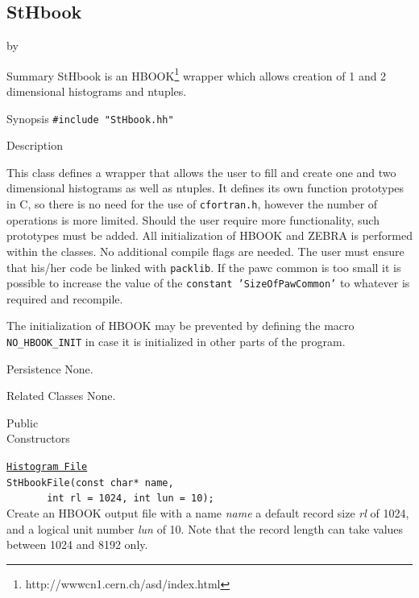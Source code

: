 \documentclass[twoside]{article}
\newcommand{\comp}[1]{\texttt{#1}}%
\newcommand{\entrylabel}[1]{\mbox{\textbf{{#1}}}\hfil}%
\newenvironment{entry}
{\begin{list}{}%
    {\renewcommand{\makelabel}{\entrylabel}%
     \setlength{\labelwidth}{90pt}%
     \setlength{\leftmargin}{\labelwidth}
     \advance\leftmargin by \labelsep%
      }%
    }%
  {\end{list}}
\newcommand{\Entrylabel}[1]%
{\raisebox{0pt}[1ex][0pt]{\makebox[\labelwidth][l]%
    {\parbox[t]{\labelwidth}{\hspace{0pt}\textbf{{#1}}}}}}
\newenvironment{Entry}%
{\renewcommand{\entrylabel}{\Entrylabel}\begin{entry}}%
  {\end{entry}}
\begin{document}
%
%
\subsection{StHbook } \label{StHbook}
\begin{Entry}
\item[Summary]
    StHbook is an HBOOK\footnote{http://wwwcn1.cern.ch/asd/index.html}
    wrapper which allows creation of 1 and 2 dimensional histograms
    and ntuples.

\item[Synopsis]
    \verb+#include "StHbook.hh"+\\    
    
\item[Description]   
    
  This class defines a wrapper that allows the user to fill and
  create one and two dimensional histograms as well as ntuples.
  It defines its own function prototypes in C, so there is no
  need for the use of \texttt{cfortran.h}, however
  the number of operations is more limited.  Should the user require
  more functionality, such prototypes must be added.
  All initialization of HBOOK and ZEBRA is performed within the
  classes.  No additional compile flags are needed.  The user
  must ensure that his/her code be linked with \comp{packlib}.
  If the \/pawc\/ common is too small it is possible to increase
  the value of the  \texttt{constant 'SizeOfPawCommon'} to whatever
  is required and recompile.

  The initialization of HBOOK may be prevented by defining
  the macro \texttt{NO\_\-HBOOK\-\_INIT} in case it is initialized
  in other parts of the program.

\item[Persistence]
  None.

\item[Related Classes]
  None.
  
\item[Public\\ Constructors]

  \comp{\underline{Histogram File}} \\
  \verb+StHbookFile(const char* name,+\\
  \verb+       int rl = 1024, int lun = 10);+\\
  Create an HBOOK output file with a name {\em name} a default
  record size {\em rl} of 1024, and a logical unit number {\em lun} of 10.
  Note that the record length can take values between 1024 and 8192 only.
  

\end{Entry}
\end{document}
